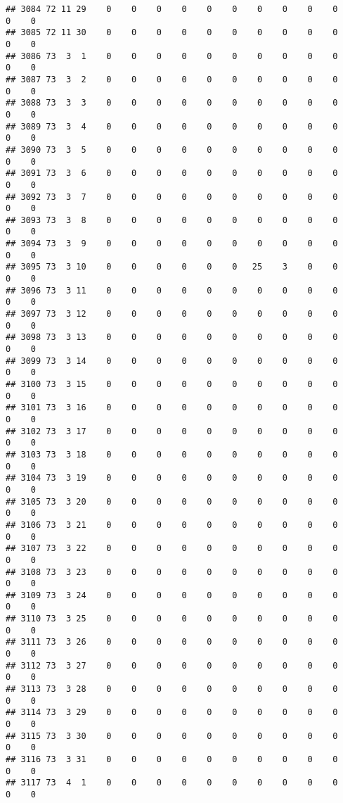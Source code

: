 \documentclass[]{article}
\begin{document}
\begin{verbatim}
## 3084 72 11 29    0    0    0    0    0    0    0    0    0    0    0    0
## 3085 72 11 30    0    0    0    0    0    0    0    0    0    0    0    0
## 3086 73  3  1    0    0    0    0    0    0    0    0    0    0    0    0
## 3087 73  3  2    0    0    0    0    0    0    0    0    0    0    0    0
## 3088 73  3  3    0    0    0    0    0    0    0    0    0    0    0    0
## 3089 73  3  4    0    0    0    0    0    0    0    0    0    0    0    0
## 3090 73  3  5    0    0    0    0    0    0    0    0    0    0    0    0
## 3091 73  3  6    0    0    0    0    0    0    0    0    0    0    0    0
## 3092 73  3  7    0    0    0    0    0    0    0    0    0    0    0    0
## 3093 73  3  8    0    0    0    0    0    0    0    0    0    0    0    0
## 3094 73  3  9    0    0    0    0    0    0    0    0    0    0    0    0
## 3095 73  3 10    0    0    0    0    0    0   25    3    0    0    0    0
## 3096 73  3 11    0    0    0    0    0    0    0    0    0    0    0    0
## 3097 73  3 12    0    0    0    0    0    0    0    0    0    0    0    0
## 3098 73  3 13    0    0    0    0    0    0    0    0    0    0    0    0
## 3099 73  3 14    0    0    0    0    0    0    0    0    0    0    0    0
## 3100 73  3 15    0    0    0    0    0    0    0    0    0    0    0    0
## 3101 73  3 16    0    0    0    0    0    0    0    0    0    0    0    0
## 3102 73  3 17    0    0    0    0    0    0    0    0    0    0    0    0
## 3103 73  3 18    0    0    0    0    0    0    0    0    0    0    0    0
## 3104 73  3 19    0    0    0    0    0    0    0    0    0    0    0    0
## 3105 73  3 20    0    0    0    0    0    0    0    0    0    0    0    0
## 3106 73  3 21    0    0    0    0    0    0    0    0    0    0    0    0
## 3107 73  3 22    0    0    0    0    0    0    0    0    0    0    0    0
## 3108 73  3 23    0    0    0    0    0    0    0    0    0    0    0    0
## 3109 73  3 24    0    0    0    0    0    0    0    0    0    0    0    0
## 3110 73  3 25    0    0    0    0    0    0    0    0    0    0    0    0
## 3111 73  3 26    0    0    0    0    0    0    0    0    0    0    0    0
## 3112 73  3 27    0    0    0    0    0    0    0    0    0    0    0    0
## 3113 73  3 28    0    0    0    0    0    0    0    0    0    0    0    0
## 3114 73  3 29    0    0    0    0    0    0    0    0    0    0    0    0
## 3115 73  3 30    0    0    0    0    0    0    0    0    0    0    0    0
## 3116 73  3 31    0    0    0    0    0    0    0    0    0    0    0    0
## 3117 73  4  1    0    0    0    0    0    0    0    0    0    0    0    0

\end{verbatim}
\end{document}
